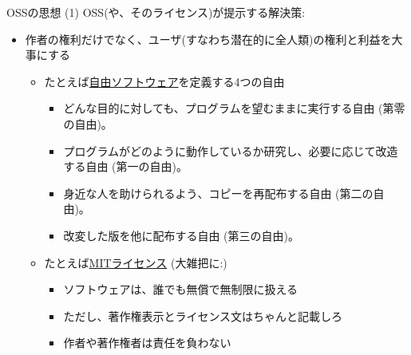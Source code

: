 \documentclass[
        unicode%
    ]{beamer}
\begin{document}
\begin{frame}{OSSの思想 (1)}
    OSS(や、そのライセンス)が提示する解決策:

    \begin{itemize}
        \item 作者の権利だけでなく、ユーザ(すなわち潜在的に全人類)の権利と利益を大事にする
            \begin{itemize}
                \pause
                \item たとえば\href{https://www.gnu.org/philosophy/free-sw.ja.html}{自由ソフトウェア}を定義する4つの自由
                    \begin{itemize}
                        \item \alert{どんな目的に対しても、プログラムを望むままに実行する}自由 (第零の自由)。
                        \item プログラムがどのように動作しているか\alert{研究し、必要に応じて改造する}自由 (第一の自由)。
                        \item 身近な人を助けられるよう、\alert{コピーを再配布する}自由 (第二の自由)。
                        \item \alert{改変した版を他に配布する}自由 (第三の自由)。
                    \end{itemize}
                \pause
                \item たとえば\href{https://ja.wikipedia.org/wiki/MIT_License}{MITライセンス} (大雑把に:)
                    \begin{itemize}
                        \item ソフトウェアは、誰でも\alert{無償で無制限}に扱える
                        \item ただし、\alert{著作権表示とライセンス文はちゃんと記載}しろ
                        \item 作者や著作権者は責任を負わない
                    \end{itemize}
            \end{itemize}
    \end{itemize}
\end{frame}
\end{document}
